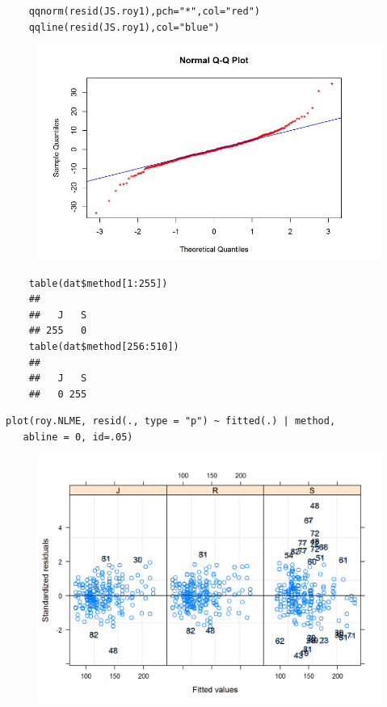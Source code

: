 \begin{framed}
	\begin{verbatim}
	qqnorm(resid(JS.roy1),pch="*",col="red")
	qqline(resid(JS.roy1),col="blue")
	\end{verbatim}
\end{framed}




\begin{figure}[h!]
	\centering
	\includegraphics[width=0.7\linewidth]{images/Resid-newplot}
	\caption{}
	\label{fig:Resid-newplot}
\end{figure}

\begin{framed}
	\begin{verbatim}
	table(dat$method[1:255])
	## 
	##   J   S 
	## 255   0
	table(dat$method[256:510])
	## 
	##   J   S 
	##   0 255
	\end{verbatim}	
\end{framed}
\newpage
\begin{framed}
\begin{verbatim}
plot(roy.NLME, resid(., type = "p") ~ fitted(.) | method, 
   abline = 0, id=.05)
\end{verbatim}
\end{framed}
\begin{figure}
\centering
\includegraphics[width=0.9\linewidth]{images/bloodnlmeResidPlot2}
\caption{}
\label{fig:blood}
\end{figure}


